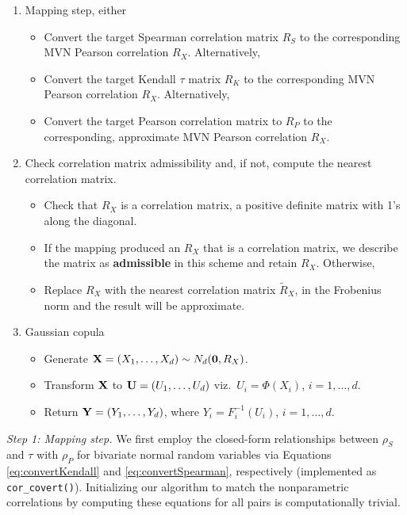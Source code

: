 \documentclass{article}
\begin{document}
\begin{enumerate}
\def\labelenumi{\arabic{enumi}.}
\tightlist
\item
  Mapping step, either

  \begin{itemize}
  \tightlist
  \item
    Convert the target Spearman correlation matrix \(R_S\) to the
    corresponding MVN Pearson correlation \(R_X\). Alternatively,
  \item
    Convert the target Kendall \(\tau\) matrix \(R_K\) to the
    corresponding MVN Pearson correlation \(R_X\). Alternatively,
  \item
    Convert the target Pearson correlation matrix to \(R_P\) to the
    corresponding, approximate MVN Pearson correlation \(R_X\).
  \end{itemize}
\item
  Check correlation matrix admissibility and, if not, compute the
  nearest correlation matrix.

  \begin{itemize}
  \tightlist
  \item
    Check that \(R_X\) is a correlation matrix, a positive definite
    matrix with 1's along the diagonal.
  \item
    If the mapping produced an \(R_X\) that is a correlation matrix, we
    describe the matrix as \textbf{admissible} in this scheme and retain
    \(R_X\). Otherwise,
  \item
    Replace \(R_X\) with the nearest correlation matrix \(\tilde{R}_X\),
    in the Frobenius norm and the result will be approximate.
  \end{itemize}
\item
  Gaussian copula

  \begin{itemize}
  \tightlist
  \item
    Generate \({\bf X}=(X_1, \ldots, X_d) \sim N_d({\bf 0}, R_X)\).
  \item
    Transform \({\bf X}\) to \({\bf U} = (U_1, \ldots, U_d)\)
    viz.~\(U_i=\Phi(X_i)\), \(i=1, \ldots, d\).
  \item
    Return \({\bf Y} = (Y_1, \ldots, Y_d)\), where
    \(Y_i=F_i^{-1}(U_i)\), \(i=1, \ldots, d\).
  \end{itemize}
\end{enumerate}

\emph{Step 1: Mapping step.} We first employ the closed-form
relationships between \(\rho_S\) and \(\tau\) with \(\rho_P\) for
bivariate normal random variables via Equations \ref{eq:convertKendall}
and \ref{eq:convertSpearman}, respectively (implemented as
\texttt{cor\_covert()}). Initializing our algorithm to match the
nonparametric correlations by computing these equations for all pairs is
computationally trivial.
\end{document}
